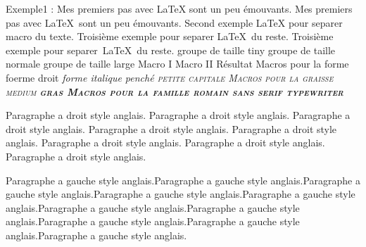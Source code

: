 \documentclass{article}
\begin{document}
Exemple1 :
Mes premiers pas avec \LaTeX{} sont un peu émouvants.
Mes premiers pas avec \LaTeX{}~sont un peu émouvants.
Second exemple {\LaTeX} pour separer macro du texte.
Troisième exemple pour separer \LaTeX\ du reste.
Troisième exemple pour separer~\LaTeX\ du reste.
{\tiny groupe de taille tiny}
{\normalsize groupe de taille normale}
{\large groupe de taille large}
Macro I  Macro II            Résultat
           Macros pour la forme
\textup \upshape foerme droit
\textit \itshape forme italique
\textsl \slshape penché
\textsc \scshape petite capitale
          Macros pour la graisse
\textmd \mdseries medium
\textbf \bfseries gras
          Macros pour la famille
\textrm \rmfamily romain
\textsf \sffamily sans serif
\texttt \ttfamily typewriter



\begin{flushright} %
Paragraphe a droit style anglais. Paragraphe a droit style anglais. Paragraphe a droit style anglais. Paragraphe a droit style anglais. Paragraphe a droit style anglais. Paragraphe a droit style anglais. Paragraphe a droit style anglais. Paragraphe a droit style anglais.
\end{flushright}

\begin{flushleft} %
Paragraphe a gauche style anglais.Paragraphe a gauche style anglais.Paragraphe a gauche style anglais.Paragraphe a gauche style anglais.Paragraphe a gauche style anglais.Paragraphe a gauche style anglais.Paragraphe a gauche style anglais.Paragraphe a gauche style anglais.Paragraphe a gauche style anglais.Paragraphe a gauche style anglais.
\end{flushleft}
\end{document}

